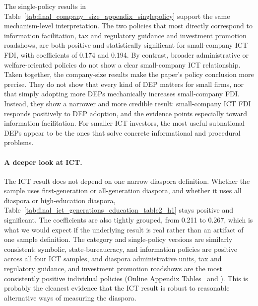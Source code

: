 \documentclass[12pt]{article}
\begin{document}
The single-policy results in Table~\ref{tab:final_company_size_appendix_singlepolicy} support the same mechanism-level interpretation. The two policies that most directly correspond to information facilitation, tax and regulatory guidance and investment promotion roadshows, are both positive and statistically significant for small-company ICT FDI, with coefficients of 0.174 and 0.194. By contrast, broader administrative or welfare-oriented policies do not show a clear small-company ICT relationship. Taken together, the company-size results make the paper's policy conclusion more precise. They do not show that every kind of DEP matters for small firms, nor that simply adopting more DEPs mechanically increases small-company FDI. Instead, they show a narrower and more credible result: small-company ICT FDI responds positively to DEP adoption, and the evidence points especially toward information facilitation. For smaller ICT investors, the most useful subnational DEPs appear to be the ones that solve concrete informational and procedural problems.



\paragraph{A deeper look at ICT.} The ICT result does not depend on one narrow diaspora definition. Whether the sample uses first-generation or all-generation diaspora, and whether it uses all diaspora or high-education diaspora, Table~\ref{tab:final_ict_generations_education_table2_h1} stays positive and significant. The coefficients are also tightly grouped, from 0.211 to 0.267, which is what we would expect if the underlying result is real rather than an artifact of one sample definition. The category and single-policy versions are similarly consistent: symbolic, state-bureaucracy, and information policies are positive across all four ICT samples, and diaspora administrative units, tax and regulatory guidance, and investment promotion roadshows are the most consistently positive individual policies (Online Appendix Tables~ and ). This is probably the cleanest evidence that the ICT result is robust to reasonable alternative ways of measuring the diaspora.


\end{document}

